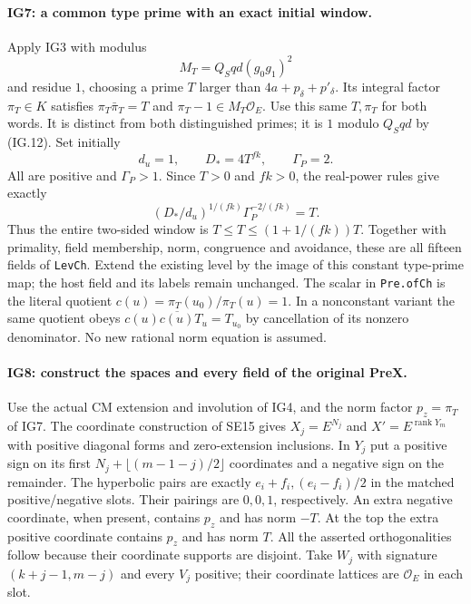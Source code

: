 \paragraph{IG7: a common type prime with an exact initial window.}
Apply IG3 with modulus
\[
                  M_T=Q_Sqd(g_0g_1)^2
\]
and residue $1$, choosing a prime $T$ larger than
$4a+p_\delta+p'_\delta$. Its integral factor $\pi_T\in K$
satisfies $\pi_T\bar\pi_T=T$ and
$\pi_T-1\in M_T\mathcal O_E$.
Use this same $T,\pi_T$ for both words. It is distinct from
both distinguished primes; it is $1$ modulo $Q_Sqd$ by (IG.12).
Set initially
\[
 d_u=1,\qquad D_*=4T^{fk},\qquad\Gamma_P=2.
                                                               \tag{IG.25}
\]
All are positive and $\Gamma_P>1$. Since $T>0$ and $fk>0$,
the real-power rules give exactly
\[
     (D_*/d_u)^{1/(fk)}\Gamma_P^{-2/(fk)}=T.
                                                               \tag{IG.26}
\]
Thus the entire two-sided window is
$T\le T\le(1+1/(fk))T$.
Together with primality, field membership, norm, congruence
and avoidance, these are all fifteen fields of \texttt{LevCh}.
Extend the existing level by the image of this constant type-prime
map; the host field and its labels remain unchanged.
The scalar in \texttt{Pre.ofCh} is the literal quotient
$c(u)=\pi_T(u_0)/\pi_T(u)=1$. In a nonconstant variant the
same quotient obeys
$c(u)\overline{c(u)}T_u=T_{u_0}$ by cancellation of its
nonzero denominator. No new rational norm equation is assumed.

\paragraph{IG8: construct the spaces and every field of the original PreX.}
Use the actual CM extension and involution of IG4, and the norm
factor $p_z=\pi_T$ of IG7. The coordinate construction of SE15
gives $X_j=E^{N_j}$ and $X'=E^{\operatorname{rank}Y_m}$ with
positive diagonal forms and zero-extension inclusions. In $Y_j$
put a positive sign on its first
$N_j+\lfloor(m-1-j)/2\rfloor$ coordinates and a negative
sign on the remainder. The hyperbolic pairs are exactly
$e_i+f_i,(e_i-f_i)/2$ in the matched positive/negative slots.
Their pairings are $0,0,1$, respectively. An extra negative
coordinate, when present, contains $p_z$ and has norm $-T$.
At the top the extra positive coordinate contains $p_z$ and
has norm $T$. All the asserted orthogonalities follow because
their coordinate supports are disjoint. Take
$W_j$ with signature $(k+j-1,m-j)$ and every $V_j$ positive;
their coordinate lattices are $\mathcal O_E$ in each slot.

